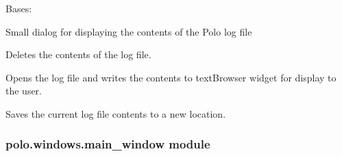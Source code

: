 \documentclass[letterpaper,10pt,english]{sphinxmanual}
\begin{document}
\begin{fulllineitems}
\label{\detokenize{polo.windows:polo.windows.log_dialog.LogDialog}}
Bases: 

Small dialog for displaying the contents of the Polo log file

\begin{fulllineitems}
\label{\detokenize{polo.windows:polo.windows.log_dialog.LogDialog.clear_log}}
Deletes the contents of the log file.

\end{fulllineitems}


\begin{fulllineitems}
\label{\detokenize{polo.windows:polo.windows.log_dialog.LogDialog.display_log_text}}
Opens the log file and writes the contents to textBrowser widget
for display to the user.

\end{fulllineitems}


\begin{fulllineitems}
\label{\detokenize{polo.windows:polo.windows.log_dialog.LogDialog.save_log_file}}
Saves the current log file contents to a new location.

\end{fulllineitems}


\end{fulllineitems}



\subsubsection{polo.windows.main\_window module}
\label{\detokenize{polo.windows:module-polo.windows.main_window}}\label{\detokenize{polo.windows:polo-windows-main-window-module}}
\end{document}
